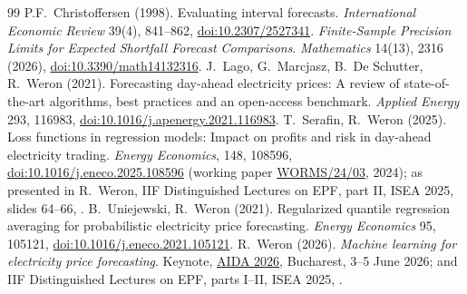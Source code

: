 \begin{thebibliography}{99}\small
{} P.F.~Christoffersen (1998). Evaluating interval forecasts. \emph{International Economic Review} 39(4), 841--862, \href{https://doi.org/10.2307/2527341}{doi:10.2307/2527341}.
 \emph{Finite-Sample Precision Limits for Expected Shortfall Forecast Comparisons}. \emph{Mathematics} 14(13), 2316 (2026), \href{https://doi.org/10.3390/math14132316}{doi:10.3390/math14132316}.
 J.~Lago, G.~Marcjasz, B.~De Schutter, R.~Weron (2021). Forecasting day-ahead electricity prices: A review of state-of-the-art algorithms, best practices and an open-access benchmark. \emph{Applied Energy} 293, 116983, \href{https://doi.org/10.1016/j.apenergy.2021.116983}{doi:10.1016/j.apenergy.2021.116983}.
 T.~Serafin, R.~Weron (2025). Loss functions in regression models: Impact on profits and risk in day-ahead electricity trading. \emph{Energy Economics}, 148, 108596, \href{https://doi.org/10.1016/j.eneco.2025.108596}{doi:10.1016/j.eneco.2025.108596} (working paper \href{https://ideas.repec.org/p/ahh/wpaper/worms2403.html}{WORMS/24/03}, 2024); as presented in R.~Weron, IIF Distinguished Lectures on EPF, part II, ISEA 2025, slides 64--66, \href{https://p.wz.pwr.edu.pl/~weron.rafal/Conf/IIF24}{}.
 B.~Uniejewski, R.~Weron (2021). Regularized quantile regression averaging for probabilistic electricity price forecasting. \emph{Energy Economics} 95, 105121, \href{https://doi.org/10.1016/j.eneco.2021.105121}{doi:10.1016/j.eneco.2021.105121}.
 R.~Weron (2026). \emph{Machine learning for electricity price forecasting}. Keynote, \href{https://www.ai4efin.ase.ro/aida-conference/}{AIDA 2026}, Bucharest, 3--5 June 2026; and IIF Distinguished Lectures on EPF, parts I--II, ISEA 2025, \href{https://p.wz.pwr.edu.pl/~weron.rafal/Conf/IIF24}{}.
\end{thebibliography}

